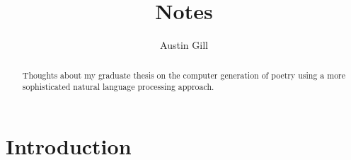 \documentclass{article}
\title{Notes}
\author{Austin Gill}
\begin{document}
    \maketitle
    \begin{abstract}
        Thoughts about my graduate thesis on the computer generation of poetry using a more sophisticated natural language processing approach.
    \end{abstract}
    \thispagestyle{empty}
    \tableofcontents
    \newpage

    \section{Introduction}\label{sec:introduction}
        

    \newpage\appendix\appendixpage{}\addappheadtotoc{}


    \newpage
    
    {}
\end{document}

